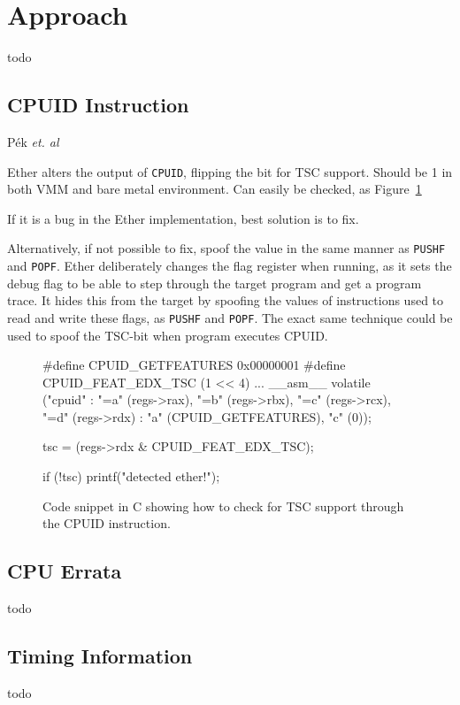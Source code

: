 \section{Approach}
\label{sec:approach}

todo


\subsection{CPUID Instruction}

P{\'e}k {\em et. al}~\cite{nether}

Ether alters the output of {\tt CPUID}, flipping the bit for TSC support. Should
be 1 in both VMM and bare metal environment. Can easily be checked, as
Figure~\ref{fig:cpuid-tsc}

If it is a bug in the Ether implementation, best solution is to fix.

Alternatively, if not possible to fix, spoof the value in the same manner as
{\tt PUSHF} and {\tt POPF}. Ether deliberately changes the flag register when
running, as it sets the debug flag to be able to step through the target program
and get a program trace. It hides this from the target by spoofing the values of
instructions used to read and write these flags, as {\tt PUSHF} and {\tt POPF}.
The exact same technique could be used to spoof the TSC-bit when program
executes CPUID.

\begin{figure}[h]
\begin{lstc}
#define CPUID_GETFEATURES 0x00000001
#define CPUID_FEAT_EDX_TSC (1 << 4)
...
__asm__ volatile ("cpuid" :
    "=a" (regs->rax),
    "=b" (regs->rbx),
    "=c" (regs->rcx),
    "=d" (regs->rdx)
    : "a" (CPUID_GETFEATURES), "c" (0));

tsc  = (regs->rdx & CPUID_FEAT_EDX_TSC);

if (!tsc) printf("detected ether!\n");
\end{lstc}
\caption{\label{fig:cpuid-tsc} Code snippet in C showing how to check for TSC
  support through the CPUID instruction.}
\end{figure}


\subsection{CPU Errata}

todo


\subsection{Timing Information}

todo


